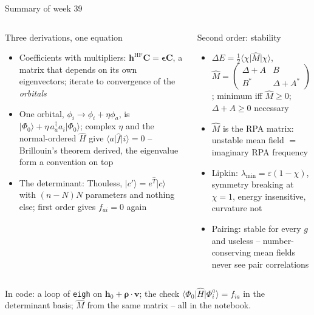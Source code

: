 \documentclass[aspectratio=169,10pt]{beamer}
\newcommand{\ket}[1]{\vert #1\rangle}
\newcommand{\bra}[1]{\langle #1\vert}
\newcommand{\element}[3]{\langle #1\vert #2\vert #3\rangle}
\begin{document}
\begin{frame}{Summary of week 39}
  \small
  \begin{columns}[T]
    \begin{block}{Three derivations, one equation}
      \begin{itemize}
        \item Coefficients with multipliers: $\bm{h}^{\mathrm{HF}}\bm{C}=\bm{\epsilon}\bm{C}$, a matrix that depends on its own eigenvectors; iterate to convergence of the \emph{orbitals}
        \item One orbital, $\phi_i\to\phi_i+\eta\phi_a$, is $\ket{\Phi_0}+\eta\,a_a^{\dagger}a_i\ket{\Phi_0}$; complex $\eta$ and the normal-ordered $\hat{H}$ give $\element{a}{\hat{f}}{i}=0$ -- Brillouin's theorem derived, the eigenvalue form a convention on top
        \item The determinant: Thouless, $\ket{c'}=e^{\hat{T}}\ket{c}$ with $(n-N)N$ parameters and nothing else; first order gives $f_{ai}=0$ again
      \end{itemize}
    \end{block}
    \begin{block}{Second order: stability}
      \begin{itemize}
        \item $\Delta E=\frac12\bra{\chi}\hat{M}\ket{\chi}$, $\hat{M}=\begin{pmatrix}\Delta+A & B\\ B^{*} & \Delta+A^{*}\end{pmatrix}$; minimum iff $\hat{M}\ge0$; $\Delta+A\ge0$ necessary
        \item $\hat{M}$ is the RPA matrix: unstable mean field $=$ imaginary RPA frequency
        \item Lipkin: $\lambda_{\min}=\varepsilon(1-\chi)$, symmetry breaking at $\chi=1$, energy insensitive, curvature not
        \item Pairing: stable for every $g$ and useless -- number-conserving mean fields never see pair correlations
      \end{itemize}
    \end{block}
  \end{columns}
  {\footnotesize In code: a loop of \texttt{eigh} on $\bm{h}_0+\bm{\rho}\cdot\bm{v}$; the check $\element{\Phi_0}{\hat{H}}{\Phi_i^a}=f_{ia}$ in the determinant basis; $\hat{M}$ from the same matrix -- all in the notebook.}
\end{frame}
\end{document}
